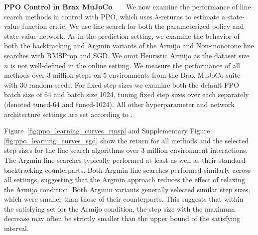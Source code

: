 \documentclass[10pt]{article} %
\newcommand{\todo}[1]{{\color{Yellow} (todo #1)}}
\begin{document}
\textbf{PPO Control in Brax MuJoCo}\ \ \ \
We now examine the performance of line search methods in control with PPO, which uses $\lambda$-returns to estimate a state-value function critic.
We use line search for both the parameterized policy and state-value network. As in the prediction setting, we examine the behavior of both the backtracking and Argmin variants of the Armijo and Non-monotone line searches with RMSProp and SGD. We omit Heuristic Armijo as the dataset size $n$ is not well-defined in the online setting. We measure the performance of all methods over 3 million steps on 5 environments from the Brax MuJoCo suite \citep{brax2021github} with 30 random seeds.
For fixed step-sizes we examine both the default PPO batch size of 64 \citep{shengyi2022the37implementation} and batch size 1024, tuning fixed step sizes over each separately (denoted tuned-64 and tuned-1024).
All other hyperparameter and network architecture settings are set according to \cite{shengyi2022the37implementation}.

Figure~\ref{fig:ppo_learning_curves_rmsp} and Supplementary Figure \ref{fig:ppo_learning_curves_sgd} show the return for all methods and the selected step sizes for the line search algorithms over 3 million environment interactions.
The Argmin line searches typically performed at least as well as their standard backtracking counterparts.
Both Argmin line searches performed similarly across all settings, suggesting that the Argmin approach reduces the effect of relaxing the Armijo condition. Both Argmin variants generally selected similar step sizes, which were smaller than those of their counterparts. This suggests that within the satisfying set for the Armijo condition, the step size with the maximum decrease may often be strictly smaller than the upper bound of the satisfying interval.
\end{document}
